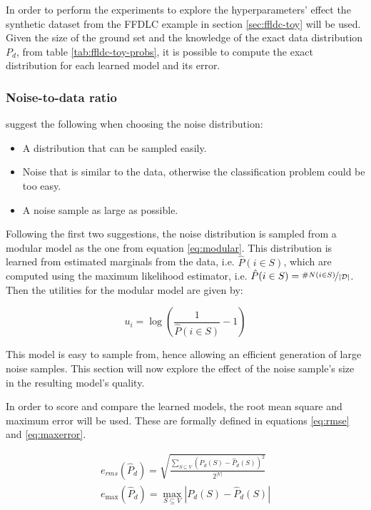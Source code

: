 In order to perform the experiments to explore the hyperparameters' effect the synthetic dataset from the FFDLC example in section \ref{sec:ffldc-toy} will be used. Given the size of the ground set and the knowledge of the exact data distribution $P_{d}$, from table \ref{tab:ffldc-toy-probs}, it is possible to compute the exact distribution for each learned model and its error.

\subsubsection{Noise-to-data ratio}

\citet{Gutmann12NCE} suggest the following when choosing the noise distribution:

\begin{itemize}
  \item A distribution that can be sampled easily.
  \item Noise that is similar to the data, otherwise the classification problem could be too easy.
  \item A noise sample as large as possible.
\end{itemize}

Following the first two suggestions, the noise distribution is sampled from a modular model as the one from equation \ref{eq:modular}. This distribution is learned from estimated marginals from the data, i.e. $\hat{P}(i \in S)$, which are computed using the maximum likelihood estimator, i.e. $\hat{P}(i \in S) = \nicefrac{\#N(i \in S)}{|\mathcal{D}|}$. Then the utilities for the modular model are given by:

\begin{equation}
  u_{i} = \log{\left(\frac{1}{\hat{P}(i \in S)} - 1\right)}
\end{equation}

This model is easy to sample from, hence allowing an efficient generation of large noise samples. This section will now explore the effect of the noise sample's size in the resulting model's quality.

In order to score and compare the learned models, the root mean square and maximum error will be used. These are formally defined in equations \ref{eq:rmse} and \ref{eq:maxerror}.

\begin{align}
  e_{rms}(\hat{P}_{d}) = \sqrt{\frac{\sum_{S \subseteq V} (P_{d}(S) - \hat{P}_{d}(S))^2}{2^{|V|}}} \label{eq:rmse} \\
  e_{\max}(\hat{P}_{d}) = \max_{S \subseteq V}{|P_{d}(S) - \hat{P}_{d}(S)|} \label{eq:maxerror}
\end{align}

